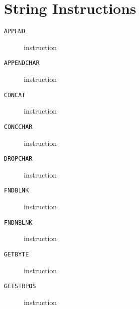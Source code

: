 \section{String Instructions}
\begin{description}
\item[\texttt{APPEND}] instruction\\

\end{description}
\clearpage
\begin{description}
\item[\texttt{APPENDCHAR}] instruction\\

\end{description}
\clearpage
\begin{description}
\item[\texttt{CONCAT}] instruction\\

\end{description}
\clearpage
\begin{description}
\item[\texttt{CONCCHAR}] instruction\\

\end{description}
\clearpage
\begin{description}
\item[\texttt{DROPCHAR}] instruction\\

\end{description}
\clearpage
\begin{description}
\item[\texttt{FNDBLNK}] instruction\\

\end{description}
\clearpage
\begin{description}
\item[\texttt{FNDNBLNK}] instruction\\

\end{description}
\clearpage
\begin{description}
\item[\texttt{GETBYTE}] instruction\\

\end{description}
\clearpage
\begin{description}
\item[\texttt{GETSTRPOS}] instruction\\

\end{description}
